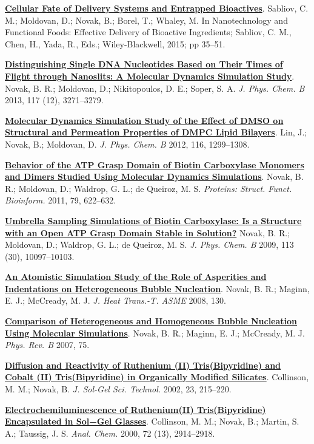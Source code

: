 \begin{cventries}
{\begin{cvitems}
        \item {\href{https://onlinelibrary.wiley.com/doi/pdf/10.1002/9781118462157#page=47}{\textbf{Cellular Fate of Delivery Systems and Entrapped Bioactives}}. Sabliov, C. M.; Moldovan, D.; Novak, B.; Borel, T.; Whaley, M. In Nanotechnology and Functional Foods: Effective Delivery of Bioactive Ingredients; Sabliov, C. M., Chen, H., Yada, R., Eds.; Wiley-Blackwell, 2015; pp 35–51.}
        \item {\href{https://doi.org/10.1021/jp309486c}{\textbf{Distinguishing Single DNA Nucleotides Based on Their Times of Flight through Nanoslits: A Molecular Dynamics Simulation Study}}. Novak, B. R.; Moldovan, D.; Nikitopoulos, D. E.; Soper, S. A. \textit{J. Phys. Chem. B} 2013, 117 (12), 3271–3279. }
        \item {\href{https://doi.org/10.1021/jp208145b}{\textbf{Molecular Dynamics Simulation Study of the Effect of DMSO on Structural and Permeation Properties of DMPC Lipid Bilayers}}. Lin, J.; Novak, B.; Moldovan, D. \textit{J. Phys. Chem. B} 2012, 116, 1299–1308.}
        \item {\href{https://doi.org/10.1002/prot.22910}{\textbf{Behavior of the ATP Grasp Domain of Biotin Carboxylase Monomers and Dimers Studied Using Molecular Dynamics Simulations}}. Novak, B. R.; Moldovan, D.; Waldrop, G. L.; de Queiroz, M. S. \textit{Proteins: Struct. Funct. Bioinform.} 2011, 79, 622–632.}
        \item{\href{https://doi.org/10.1021/jp810650q}{\textbf{Umbrella Sampling Simulations of Biotin Carboxylase: Is a Structure with an Open ATP Grasp Domain Stable in Solution?}} Novak, B. R.; Moldovan, D.; Waldrop, G. L.; de Queiroz, M. S. \textit{J. Phys. Chem. B} 2009, 113 (30), 10097–10103.}
        \item{\href{https://doi.org/10.1115/1.2818771}{\textbf{An Atomistic Simulation Study of the Role of Asperities and Indentations on Heterogeneous Bubble Nucleation}}. Novak, B. R.; Maginn, E. J.; McCready, M. J. \textit{J. Heat Trans.-T. ASME} 2008, 130.}
        \item{\href{https://doi.org/10.1103/PhysRevB.75.085413}{\textbf{Comparison of Heterogeneous and Homogeneous Bubble Nucleation Using Molecular Simulations}}. Novak, B. R.; Maginn, E. J.; McCready, M. J. \textit{Phys. Rev. B} 2007, 75. }
        \item{\href{https://doi.org/10.1023/A:1013966629311}{\textbf{Diffusion and Reactivity of Ruthenium (II) Tris(Bipyridine) and Cobalt (II) Tris(Bipyridine) in Organically Modified Silicates}}. Collinson, M. M.; Novak, B. \textit{J. Sol-Gel Sci. Technol.} 2002, 23, 215–220.}
        \item{\href{https://doi.org/10.1021/ac9913208}{\textbf{Electrochemiluminescence of Ruthenium(II) Tris(Bipyridine) Encapsulated in Sol−Gel Glasses}}. Collinson, M. M.; Novak, B.; Martin, S. A.; Taussig, J. S. \textit{Anal. Chem.} 2000, 72 (13), 2914–2918.}        
      \end{cvitems}
    }
    

\end{cventries}
